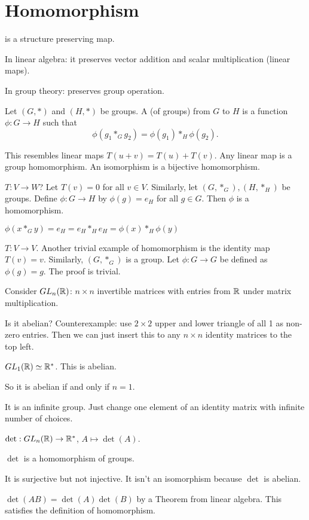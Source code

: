 \documentclass[class=article,crop=false]{standalone}
\begin{document}
\section{Homomorphism}

\begin{note}[]
 is a structure preserving map. 
\end{note}
In linear algebra: it preserves vector addition and scalar multiplication (linear maps).

In group theory: preserves group operation.

\begin{defn}[]
	Let $ (G,*)$ and  $ (H,*)$ be groups. A   (of groups) from $ G$ to  $ H$ is a function $ \phi: G \to H$ such that 
	\[
		\phi(g_1 *_G g_2) = \phi(g_1) *_H \phi(g_2)
	.\] 
\end{defn}
\begin{note}[]
	This resembles linear maps $ T(u+v)=T(u)+T(v)$. Any linear map is a group homomorphism. An isomorphism is a bijective homomorphism.
\end{note}

\begin{eg}[uninteresting]
	$ T:V \to W$? Let $ T(v)=0$ for all  $ v \in V$. Similarly, let $ (G,*_G), (H,*_H)$ be groups. Define $ \phi: G \to H$ by $ \phi(g) =e_H$ for all $ g \in G$. Then $ \phi$ is a homomorphism.

	\begin{prf}
		$ \phi(x*_G y) = e_H = e_H *_H e_H = \phi(x) *_H \phi(y)$
	\end{prf}
\end{eg}
\begin{eg}[]
	$ T: V \to V$. Another trivial example of homomorphism is the identity map $ T(v) = v$. Similarly, $ (G,*_G)$ is a group. Let  $ \phi: G \to G$ be defined as $ \phi(g)=g$. The proof is trivial.
\end{eg}
\begin{eg}
	Consider $ GL_n( \mathbb{R})$: $ n\times n$ invertible matrices with entries from $ \mathbb{R}$ under matrix multiplication. 

	Is it abelian? Counterexample: use $ 2 \times 2$ upper and lower triangle of all 1 as non-zero entries. Then we can just insert this to any $ n \times n$ identity matrices to the top left.

	$ GL_1( \mathbb{R}) \simeq \mathbb{R}^* $. This is abelian.

	So it is abelian if and only if $ n=1$.

	It is an infinite group. Just change one element of an identity matrix with infinite number of choices.

	$\det: GL_n( \mathbb{R}) \to \mathbb{R}^* $, $ A \mapsto \det(A)$.
\begin{claim}[]
$ \det$ is a homomorphism of groups. 
\end{claim}
	 It is surjective but not injective.
It isn't an isomorphism because $ \det$ is abelian. 

$ \det(AB) = \det (A) \det (B)$ by a Theorem from linear algebra. This satisfies the definition of homomorphism.
\end{eg}
\end{document}
